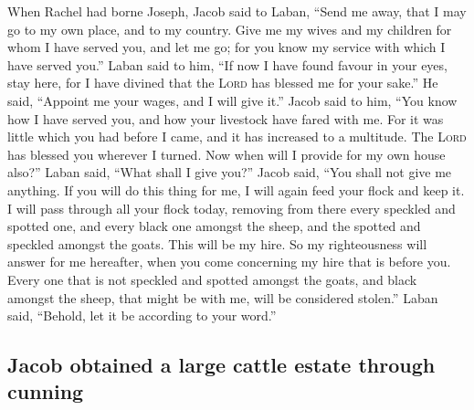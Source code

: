  When Rachel had borne Joseph, Jacob said to Laban,
``Send me away, that I may go to my own place, and to my country.
 Give me my wives and my children for whom I have served
you, and let me go; for you know my service with which I have served
you.''  Laban said to him, ``If now I have found favour
in your eyes, stay here, for I have divined that the \textsc{Lord} has
blessed me for your sake.''  He said, ``Appoint me your
wages, and I will give it.''  Jacob said to him, ``You
know how I have served you, and how your livestock have fared with me.
 For it was little which you had before I came, and it
has increased to a multitude. The \textsc{Lord} has blessed you wherever
I turned. Now when will I provide for my own house also?''
 Laban said, ``What shall I give you?'' Jacob said, ``You
shall not give me anything. If you will do this thing for me, I will
again feed your flock and keep it.  I will pass through
all your flock today, removing from there every speckled and spotted
one, and every black one amongst the sheep, and the spotted and speckled
amongst the goats. This will be my hire.  So my
righteousness will answer for me hereafter, when you come concerning my
hire that is before you. Every one that is not speckled and spotted
amongst the goats, and black amongst the sheep, that might be with me,
will be considered stolen.''  Laban said, ``Behold, let
it be according to your word.''

\hypertarget{jacob-obtained-a-large-cattle-estate-through-cunning}{%
\subsection{Jacob obtained a large cattle estate through
cunning}\label{jacob-obtained-a-large-cattle-estate-through-cunning}}

